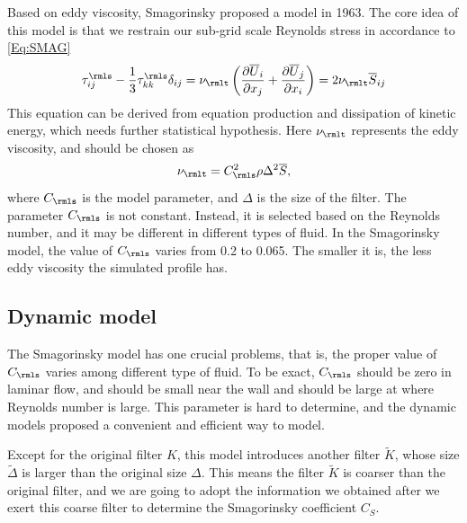 \documentclass[english, nochinese]{pkupaper}
\begin{document}
Based on eddy viscosity, Smagorinsky proposed a model in 1963. The core idea of this model is that we restrain our sub-grid scale Reynolds stress in accordance to \eqref{Eq:SMAG}
\begin{equation}\label{Eq:SMAG}
\tau^{\rmls}_{ij} - \frac{1}{3}\tau^{\rmls}_{kk}\delta_{ij} = \nu_{\rmlt} \left(\frac{\partial\overline{U}_i}{\partial x_j} + \frac{\partial\overline{U}_j}{\partial x_i}\right) = 2\nu_{\rmlt}\overline{S}_{ij}
\end{equation}
This equation can be derived from equation production and dissipation of kinetic energy, which needs further statistical hypothesis. Here $\nu_{\rmlt}$ represents the eddy viscosity, and should be chosen as
\begin{equation}\label{Eq:MuT}
\nu_{\rmlt} = C_{\rmls}^2\rho\Delta^2\overline{S},
\end{equation}
where $C_{\rmls}$ is the model parameter, and $\Delta$ is the size of the filter. 
The parameter $C_{\rmls}$ is not constant. Instead, it is selected based on the Reynolds number, and it may be different in different types of fluid. In the Smagorinsky model, the value of $C_{\rmls}$ varies from 0.2 to 0.065. The smaller it is, the less eddy viscosity the simulated profile has.

\subsection{Dynamic model}

The Smagorinsky model has one crucial problems, that is, the proper value of $C_{\rmls}$ varies among different type of fluid. To be exact, $C_{\rmls}$ should be zero in laminar flow, and should be small near the wall and should be large at where Reynolds number is large. This parameter is hard to determine, and the dynamic models proposed a convenient and efficient way to model.

Except for the original filter $K$, this model introduces another filter $\widetilde{K}$, whose size $\widetilde{\Delta}$ is larger than the original size $\Delta$. This means the filter $\widetilde{K}$ is coarser than the original filter, and we are going to adopt the information we obtained after we exert this coarse filter to determine the Smagorinsky coefficient $C_S$.
\end{document}
